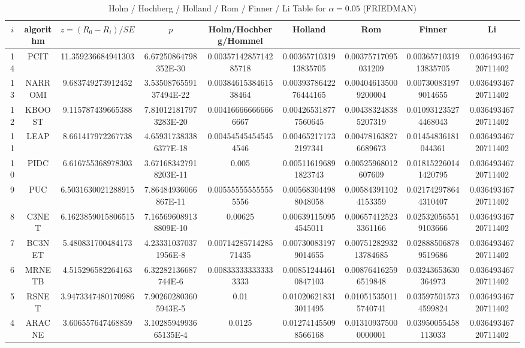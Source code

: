 \documentclass[a4paper,10pt]{article}
\begin{document}
\begin{landscape}
\begin{table}[!htp]
\begin{tabular}{
|r|r|r|r|r|r|r|r|r|r|r|r|r|r|r|r|}
\end{tabular}
\end{table}

\newpage

\begin{table}[!htp]
\centering\scriptsize
\caption{Holm / Hochberg / Holland / Rom / Finner / Li Table for $\alpha=0.05$ (FRIEDMAN)}
\begin{tabular}{ccccccccc}
$i$&algorithm&$z=(R_0 - R_i)/SE$&$p$&Holm/Hochberg/Hommel&Holland&Rom&Finner&Li\\
\hline
14&PCIT&11.359236684941303&6.67250864798352E-30&0.0035714285714285718&0.0036571031913835705&0.00375717095031209&0.0036571031913835705&0.03649346720711402\\
13&NARROMI&9.683749273912452&3.5350876559137494E-22&0.0038461538461538464&0.0039378642276444165&0.004046135009200004&0.007300831979014655&0.03649346720711402\\
12&KBOOST&9.115787439665388&7.810121817973283E-20&0.004166666666666667&0.004265318777560645&0.004383248385207319&0.010931235274468043&0.03649346720711402\\
11&LEAP&8.661417972267738&4.659317383386377E-18&0.004545454545454546&0.004652171732197341&0.004781638276689673&0.01454836181044361&0.03649346720711402\\
10&PIDC&6.616755368978303&3.671683427918203E-11&0.005&0.005116196891823743&0.00525968012607609&0.018152260141420795&0.03649346720711402\\
9&PUC&6.5031630021288915&7.86484936066867E-11&0.005555555555555556&0.005683044988048058&0.005843911024153359&0.021742978644310407&0.03649346720711402\\
8&C3NET&6.1623859015806515&7.165696089138809E-10&0.00625&0.006391150954545011&0.006574125233361166&0.025320565519103666&0.03649346720711402\\
7&BC3NET&5.480831700484173&4.233310370371956E-8&0.0071428571428571435&0.007300831979014655&0.0075128293213784685&0.028885068789519686&0.03649346720711402\\
6&MRNETB&4.515296582264163&6.32282136687744E-6&0.008333333333333333&0.008512444610847103&0.008764162596519848&0.03243653630364973&0.03649346720711402\\
5&RSNET&3.9473347480170986&7.902602803605943E-5&0.01&0.010206218313011495&0.010515350115740741&0.035975015734599824&0.03649346720711402\\
4&ARACNE&3.606557647468859&3.1028594993665135E-4&0.0125&0.012741455098566168&0.013109375000000001&0.03950055458113033&0.03649346720711402\\

\end{tabular}
\end{table}
\end{landscape}
\end{document}
